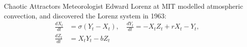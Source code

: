 \documentclass[10pt]{beamer}
\begin{document}
\begin{frame}{Chaotic Attractors}
Meteorologist Edward Lorenz at MIT modelled atmospheric convection, and discovered the Lorenz system in 1963:
\begin{align*}
\frac{dX_t}{dt}&=\sigma(Y_t-X_t),\quad \frac{dY_t}{dt}=-X_tZ_t+rX_t-Y_t,\\
\frac{dZ_t}{dt}&=X_tY_t-bZ_t
\end{align*}
\end{frame}
\end{document}
